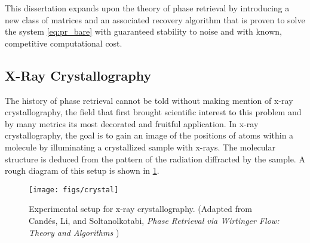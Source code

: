 This dissertation expands upon the theory of phase retrieval by introducing a new class of matrices and an associated recovery algorithm that is proven to solve the system \eqref{eq:pr_bare} with guaranteed stability to noise and with known, competitive computational cost.

\subsection{X-Ray Crystallography}
\label{sec:crystallography}
The history of phase retrieval cannot be told without making mention of x-ray crystallography, the field that first brought scientific interest to this problem and by many metrics its most decorated and fruitful application.  In x-ray crystallography, the goal is to gain an image of the positions of atoms within a molecule by illuminating a crystallized sample with x-rays.  The molecular structure is deduced from the pattern of the radiation diffracted by the sample.  A rough diagram of this setup is shown in \cref{fig:xray_cryst}.
\begin{figure}
  \centering\texttt{[image: figs/crystal]}
  \caption[Experimental setup for x-ray crystallography]
          {Experimental setup for x-ray crystallography.   {\small
              (Adapted from Cand\'{e}s, Li, and Soltanolkotabi, \emph{Phase Retrieval via Wirtinger Flow: Theory and Algorithms} \cite{candes2015wtf})}}
          \label{fig:xray_cryst}
\end{figure}
